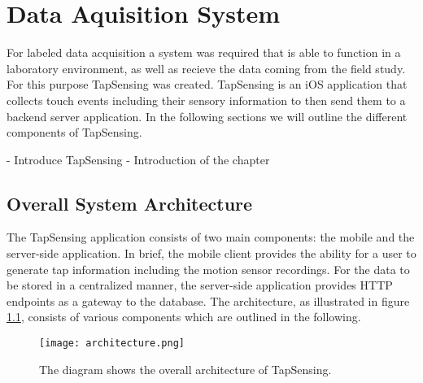 \chapter{Data Aquisition System\label{cha:chapter3}}
For labeled data acquisition a system was required that is able to function in a laboratory environment, as well as recieve the data coming from the field study. For this purpose TapSensing was created. TapSensing is an iOS application that collects touch events including their sensory information to then send them to a backend server application. In the following sections we will outline the different components of TapSensing. 

- Introduce TapSensing
- Introduction of the chapter

\section{Overall System Architecture}

The TapSensing application consists of two main components: the mobile and the server-side application. In brief, the mobile client provides the ability for a user to generate tap information including the motion sensor recordings. For the data to be stored in a centralized manner, the server-side application provides HTTP endpoints as a gateway to the database. The architecture, as illustrated in figure \ref{fig:architecture}, consists of various components which are outlined in the following. \\

\begin{figure}[h!]
  \centering
  \texttt{[image: architecture.png]}
  \caption{The diagram shows the overall architecture of TapSensing.} \label{fig:architecture}
\end{figure}

